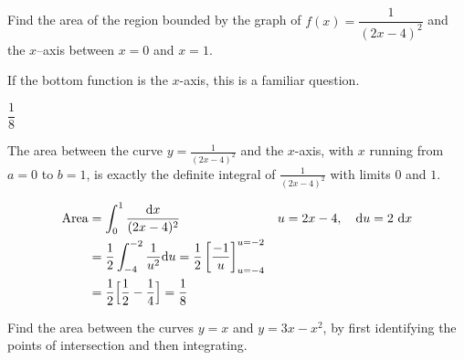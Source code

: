 \subsection*{\Procedural}



\begin{Mquestion}[M105 2013A]
Find the area of the region bounded by the graph of
$f (x) = \dfrac{1}{(2x-4)^2}$ and the $x$--axis
between $x = 0$ and $x = 1$.
\end{Mquestion}

\begin{hint}
If the bottom function is the $x$-axis, this is a familiar question.
\end{hint}

\begin{answer}
$\dfrac{1}{8}$
\end{answer}

\begin{solution}
\begin{center}
\end{center}

The area between the curve $y= \frac{1}{(2x-4)^2}$
and the $x$-axis, with $x$ running from $a=0$ to
$b=1$, is exactly the definite integral of $\frac{1}{(2x-4)^2}$ with limits $0$ and $1$.

\begin{align*}
\mbox{Area}&=\int_0^1 \frac{\mathrm{d}x}{(2x-4)^2}&u=2x-4,\quad\mathrm{d}u=2\ \mathrm{d}x\\
&=\frac{1}{2}\int_{-4}^{-2}\frac{1}{u^2}\mathrm{d}u = \frac{1}{2}\left[\frac{-1}{u}\right]_{u=-4}^{u=-2}\\
&=\frac{1}{2}\Big[\frac{1}{2}-\frac{1}{4}\Big]
=\frac{1}{8}
\end{align*}

\end{solution}

\begin{question}[2016Q2]
Find the area between the curves $y=x$ and $y=3x-x^2$, by first identifying the points of intersection and then integrating.
\end{question}

